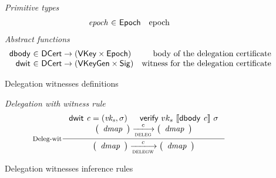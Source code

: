 \begin{figure}
  \emph{Primitive types}
  \begin{equation*}
    \begin{array}{r@{~\in~}lr}
      \var{epoch} & \Epoch & \text{epoch}
    \end{array}
  \end{equation*}
  \emph{Abstract functions}
  \begin{equation*}
    \begin{array}{r@{~\in~}lr}
      \fun{dbody} & \DCert \to (\VKey \times \Epoch)
      & \text{body of the delegation certificate}\\
      \fun{dwit} & \DCert \to (\VKeyGen \times \Sig)
      & \text{witness for the delegation certificate}
    \end{array}
  \end{equation*}
  \caption{Delegation witnesses definitions}
  \label{fig:defs:delegationw}
\end{figure}

\begin{figure}
  \emph{Delegation with witness rule}
  \begin{equation}
    \label{eq:deleg-witnesses}
    \inference[Deleg-wit]
    { \dwit{c} = (\var{vk_s}, \sigma) & \verify{vk_s}{\serialised{\dbody{c}}}{\sigma} \\
      {\left(
        \begin{array}{r}
          \var{dmap}
        \end{array}
      \right)}
      \trans{deleg}{c}
      {\left(
      \begin{array}{l}
          \var{dmap}
      \end{array}
      \right)}
    }
    {
      {\left(
        \begin{array}{r}
          \var{dmap}
        \end{array}
      \right)}
      \trans{delegw}{c}
      {\left(
      \begin{array}{l}
          \var{dmap}
      \end{array}
      \right)}}
  \end{equation}
  \caption{Delegation witnesses inference rules}
  \label{fig:rules:delegationw}
\end{figure}
